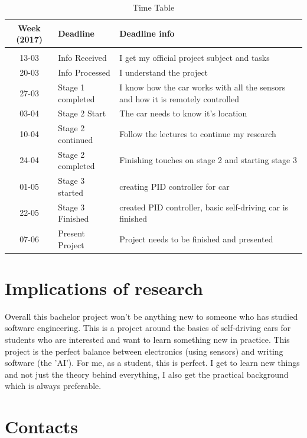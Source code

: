 \documentclass[a4paper,notitlepage]{article}
\begin{document}
\begin{table}[h]
\centering
\begin{tabular}{ c | p{3cm} | p{6cm} }
	
	{\bf{Week (2017)}} & {\bf{Deadline}} & {\bf{Deadline info}} \\
	\hline
	&&\\
	13-03 & Info Received & I get my official project subject and tasks \\
	20-03 & Info Processed & I understand the project \\
	27-03 & Stage 1 completed & I know how the car works with all the sensors and how it is remotely controlled \\
	03-04 & Stage 2 Start & The car needs to know it's location\\
	10-04 & Stage 2 continued & Follow the lectures to continue my research\\
	24-04 & Stage 2 completed & Finishing touches on stage 2 and starting stage 3\\
	01-05 & Stage 3 started & creating PID controller for car\\
	22-05 & Stage 3 Finished & created PID controller, basic self-driving car is finished\\ 
	07-06 & Present Project & Project needs to be finished and presented\\
\end{tabular}
\caption{Time Table}
\end{table}

\section*{Implications of research}

Overall this bachelor project won't be anything new to someone who has studied software engineering. This is a project around the basics of self-driving cars for students who are interested and want to learn something new in practice. This project is the perfect balance between electronics (using sensors) and writing software (the 'AI'). For me, as a student, this is perfect. I get to learn new things and not just the theory behind everything, I also get the practical background which is always preferable.

\section*{Contacts}
\end{document}
